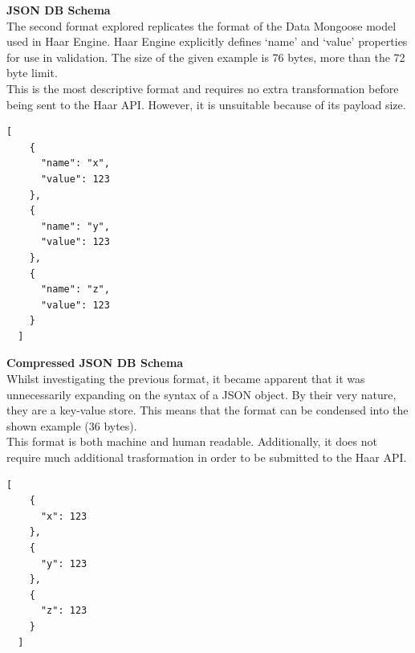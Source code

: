       \noindent
      \begin{minipage}[t]{0.45\textwidth}
        \textbf{JSON DB Schema}\\
        The second format explored replicates the format of the Data Mongoose model used in Haar Engine. Haar Engine explicitly defines `name' and `value' properties for use in validation. The size of the given example is 76 bytes, more than the 72 byte limit.\\

        This is the most descriptive format and requires no extra transformation before being sent to the Haar API. However, it is unsuitable because of its payload size.
      \end{minipage}
      \hfill
      \begin{minipage}[t]{0.45\textwidth}
        \begin{lstlisting}[frame=single, upquote=true]
  [
    {
      "name": "x",
      "value": 123
    },
    {
      "name": "y",
      "value": 123
    },
    {
      "name": "z",
      "value": 123
    }
  ]
        \end{lstlisting}
      \end{minipage}

      \noindent
      \begin{minipage}[t]{0.45\textwidth}
        \textbf{Compressed JSON DB Schema}\\
        Whilst investigating the previous format, it became apparent that it was unnecessarily expanding on the syntax of a JSON object. By their very nature, they are a key-value store. This means that the format can be condensed into the shown example (36 bytes).\\

        This format is both machine and human readable. Additionally, it does not require much additional trasformation in order to be submitted to the Haar API.\\
      \end{minipage}
      \hfill
      \begin{minipage}[t]{0.45\textwidth}
        \begin{lstlisting}[frame=single, upquote=true]
  [
    {
      "x": 123
    },
    {
      "y": 123
    },
    {
      "z": 123
    }
  ]
        \end{lstlisting}
      \end{minipage}

